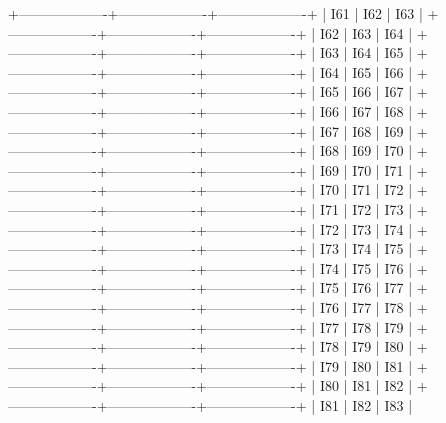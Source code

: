 +-------------------+-------------------+-------------------+
|       I61          |       I62          |       I63         |
+-------------------+-------------------+-------------------+
|       I62          |       I63          |       I64         |
+-------------------+-------------------+-------------------+
|       I63          |       I64          |       I65         |
+-------------------+-------------------+-------------------+
|       I64          |       I65          |       I66         |
+-------------------+-------------------+-------------------+
|       I65          |       I66          |       I67         |
+-------------------+-------------------+-------------------+
|       I66          |       I67          |       I68         |
+-------------------+-------------------+-------------------+
|       I67          |       I68          |       I69         |
+-------------------+-------------------+-------------------+
|       I68          |       I69          |       I70         |
+-------------------+-------------------+-------------------+
|       I69          |       I70          |       I71         |
+-------------------+-------------------+-------------------+
|       I70          |       I71          |       I72         |
+-------------------+-------------------+-------------------+
|       I71          |       I72          |       I73         |
+-------------------+-------------------+-------------------+
|       I72          |       I73          |       I74         |
+-------------------+-------------------+-------------------+
|       I73          |       I74          |       I75         |
+-------------------+-------------------+-------------------+
|       I74          |       I75          |       I76         |
+-------------------+-------------------+-------------------+
|       I75          |       I76          |       I77         |
+-------------------+-------------------+-------------------+
|       I76          |       I77          |       I78         |
+-------------------+-------------------+-------------------+
|       I77          |       I78          |       I79         |
+-------------------+-------------------+-------------------+
|       I78          |       I79          |       I80         |
+-------------------+-------------------+-------------------+
|       I79          |       I80          |       I81         |
+-------------------+-------------------+-------------------+
|       I80          |       I81          |       I82         |
+-------------------+-------------------+-------------------+
|       I81          |       I82          |       I83         |
